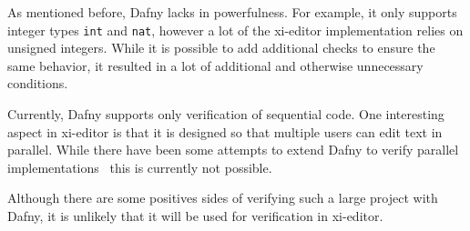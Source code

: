 As mentioned before, Dafny lacks in powerfulness.
For example, it only supports integer types \texttt{int} and \texttt{nat}, however a lot of the xi-editor implementation relies on unsigned integers.
While it is possible to add additional checks to ensure the same behavior, it resulted in a lot of additional and otherwise unnecessary conditions.

Currently, Dafny supports only verification of sequential code.
One interesting aspect in xi-editor is that it is designed so that multiple users can edit text in parallel.
While there have been some attempts to extend Dafny to verify parallel implementations~\cite{mediero2017verification} this is currently not possible.

Although there are some positives sides of verifying such a large project with Dafny, it is unlikely that it will be used for verification in xi-editor.
